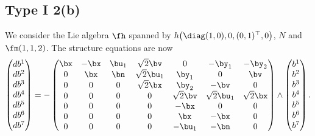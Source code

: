 \subsection{Type I 2(b)}
We consider the Lie algebra $\fh$ spanned by $h\big(\diag(1,0),0,(0,1)^\top,0\big)$, $N$ and $\fm(1,1,2)$.
The structure equations are now
\begin{gather}\label{EI2(b)}\left(\begin{matrix} db^1\\db^2\\db^3\\db^4\\db^5\\db^6\\db^7\end{matrix}\right) = -\left(
\begin{matrix}
{\bx} &-\bx&\bu_1&\sqrt2 \bv&0&-\by_1&-\by_2\\
0&\bx&\bn&\sqrt2 \bu_1&\by_1&0&\bv\\
0&0&0&\sqrt 2 \bx&\by_2&-\bv&0\\
0&0&0&0&\sqrt2\bv&\sqrt2 \bu_1&\sqrt 2 \bx\\
0&0&0&0&-\bx&0&0\\
0&0&0&0&\bx&-\bx&0\\
0&0&0&0&-\bu_1&-\bn&0
\end{matrix}\right) \wedge \left(\begin{matrix} b^1\\b^2\\b^3\\b^4\\b^5\\b^6\\b^7\end{matrix}\right).
\end{gather}
